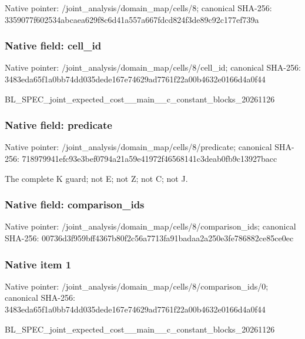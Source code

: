 \documentclass[10pt,a4paper]{article}
\begin{document}
Native pointer: /joint\_analysis/domain\_map/cells/8; canonical SHA-256: 3359077f602534abcaea629f\allowbreak{}8c6d41a557a667fdcd824f3d\allowbreak{}e89c92c177ef739a



\subsubsection{Native field: cell\_id}


Native pointer: /joint\_analysis/domain\_m\allowbreak{}ap/cells/8/cell\_id; canonical SHA-256: 3483eda65f1a0bb74dd035de\allowbreak{}de167e74629ad7761f22a00b\allowbreak{}4632e0166d4a0f44


BL\_SPEC\_joint\_expected\_c\allowbreak{}ost\_\_main\_\_c\_constant\_bl\allowbreak{}ocks\_20261126


\subsubsection{Native field: predicate}


Native pointer: /joint\_analysis/domain\_m\allowbreak{}ap/cells/8/predicate; canonical SHA-256: 718979941efc93e3bef0794a\allowbreak{}21a59e41972f46568141c3de\allowbreak{}ab0fb9c13927bacc


The complete K guard; not E; not Z; not C; not J.


\subsubsection{Native field: comparison\_ids}


Native pointer: /joint\_analysis/domain\_m\allowbreak{}ap/cells/8/comparison\_id\allowbreak{}s; canonical SHA-256: 00736d3f959bff4367b80f2c\allowbreak{}56a7713fa91badaa2a250e3f\allowbreak{}e786882ce85ce0ec



\subsubsection{Native item 1}


Native pointer: /joint\_analysis/domain\_m\allowbreak{}ap/cells/8/comparison\_id\allowbreak{}s/0; canonical SHA-256: 3483eda65f1a0bb74dd035de\allowbreak{}de167e74629ad7761f22a00b\allowbreak{}4632e0166d4a0f44


BL\_SPEC\_joint\_expected\_c\allowbreak{}ost\_\_main\_\_c\_constant\_bl\allowbreak{}ocks\_20261126
\end{document}
